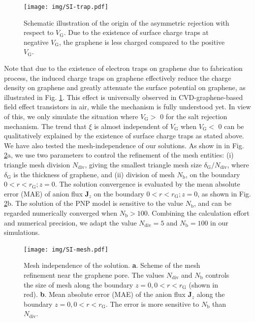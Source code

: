 \documentclass[manuscript=suppinfo,email=true, hyperref=true, keywords=false]{achemso}
\newcommand{\Fig}{Fig.}
\begin{document}
\begin{figure}[htbp]
  \centering
  \texttt{[image: img/SI-trap.pdf]}
  \caption{Schematic illustration of the origin of the asymmetric
    rejection with respect to $V_{\mathrm{G}}$. Due to the
    existence of surface charge traps at negative $V_{\mathrm{G}}$,
    the graphene is less charged compared to the positive
    $V_{\mathrm{G}}$.}
  \label{fig:trap}
\end{figure}

Note that due to the existence of electron traps on graphene due to
fabrication process, the induced charge traps on graphene effectively
reduce the charge density on graphene and greatly attenuate the
surface potential on graphene, as illustrated in \Fig
\ref{fig:trap}. This effect is universally observed in
CVD-graphene-based field effect transistors in air, while the
mechanism is fully understood yet. In view of this, we only simulate
the situation where $V_{\mathrm{G}}>$ 0 for the salt rejection
mechanism. The trend that $\xi$ is almost independent of
$V_{\mathrm{G}}$ when $V_{\mathrm{G}}<$ 0 can be qualitatively
explained by the existence of surface charge traps as stated above.
We have also tested the mesh-independence of our solutions. As show in
in \Fig{} \ref{fig:mesh}a, we use two parameters to control the
refinement of the mesh entities: (i) triangle mesh division
$N_{\mathrm{div}}$, giving the smallest triangle mesh size
$\delta_{\mathrm{G}} / N_{\mathrm{div}}$, where $\delta_{\mathrm{G}}$
is the thickness of graphene, and (ii) division of mesh
$N_{\mathrm{b}}$, on the boundary $0<r<r_{\mathrm{G}};z=0$. The
solution convergence is evaluated by the mean absolute error (MAE) of
anion flux $\boldsymbol{J}_{z}$ on the boundary
$0<r<r_{\mathrm{G}};z=0$, as shown in \Fig{}
\ref{fig:mesh}b. The solution of the PNP model is sensitive to the
value $N_{\mathrm{b}}$, and can be regarded numerically converged when
$N_{\mathrm{b}}>100$. Combining the calculation effort and numerical
precision, we adapt the value $N_{\mathrm{div}}=5$ and
$N_{\mathrm{b}}=100$ in our simulations.

\begin{figure}[htbp]
  \centering
  \texttt{[image: img/SI-mesh.pdf]}
  \caption{Mesh independence of the solution. \textbf{a}. Scheme of
    the mesh refinement near the graphene pore. The values
    $N_{\mathrm{div}}$ and $N_{\mathrm{b}}$ controls the size of mesh
    along the boundary $z=0, 0<r<r_{\mathrm{G}}$ (shown in
    red). \textbf{b}. Mean absolute error (MAE) of the anion flux
    $\boldsymbol{J}_{z}$ along the boundary $z=0,
    0<r<r_{\mathrm{G}}$. The error is more sensitive to
    $N_{\mathrm{b}}$ than $N_{\mathrm{div}}$.}
  \label{fig:mesh}
\end{figure}
\end{document}
